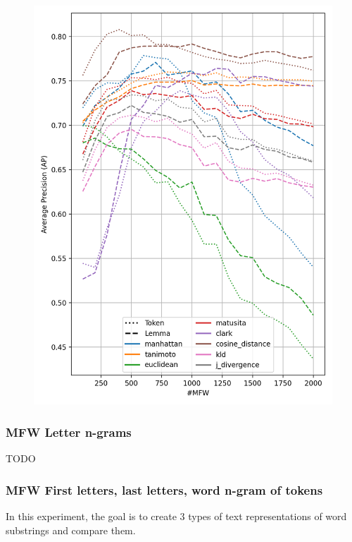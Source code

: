 \begin{figure}
  \label{fig:token_vs_lemma_brunet}
  \includegraphics[width=0.9\linewidth]{img/token_vs_lemma_st_jean.png}
\end{figure}

\subsubsection{MFW Letter n-grams}

TODO

\subsubsection{MFW First letters, last letters, word n-gram of tokens}

In this experiment, the goal is to create 3 types of text representations of word substrings and compare them.

